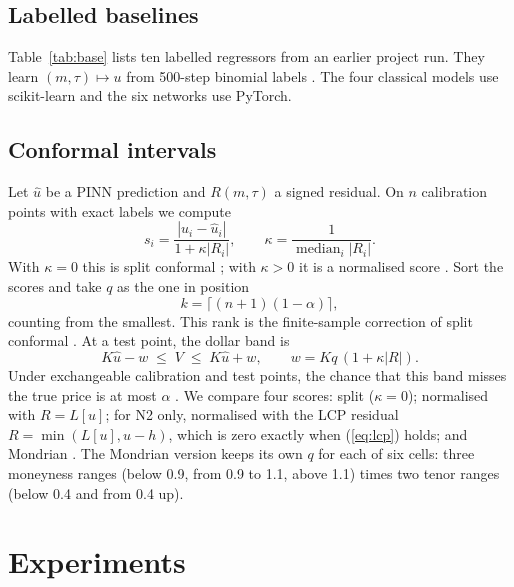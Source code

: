 \documentclass[conference]{IEEEtran}
\DeclareMathOperator*{\median}{median}
\begin{document}
\subsection{Labelled baselines}
Table~\ref{tab:base} lists ten labelled regressors from an earlier project run. They learn $(m,\tau)\mapsto u$ from 500-step binomial labels \cite{cox1979option}. The four classical models use scikit-learn \cite{pedregosa2011scikit} and the six networks use PyTorch.

\subsection{Conformal intervals}
Let $\hat u$ be a PINN prediction and $R(m,\tau)$ a signed residual. On $n$ calibration points with exact labels we compute
\begin{equation}
s_i=\frac{|u_i-\hat u_i|}{1+\kappa|R_i|},\qquad \kappa=\frac{1}{\median_i|R_i|}. \label{eq:score}
\end{equation}
With $\kappa=0$ this is split conformal \cite{papadopoulos2002inductive}; with $\kappa>0$ it is a normalised score \cite{papadopoulos2011regression}. Sort the scores and take $q$ as the one in position
\begin{equation}
k=\lceil (n+1)(1-\alpha)\rceil , \label{eq:k}
\end{equation}
counting from the smallest. This rank is the finite-sample correction of split conformal \cite{lei2018distribution}. At a test point, the dollar band is
\begin{equation}
K\hat u-w\;\le\;V\;\le\;K\hat u+w,\qquad w=Kq\,(1+\kappa|R|). \label{eq:band}
\end{equation}
Under exchangeable calibration and test points, the chance that this band misses the true price is at most $\alpha$ \cite{lei2018distribution}. We compare four scores: split ($\kappa=0$); normalised with $R=L[u]$; for N2 only, normalised with the LCP residual $R=\min(L[u],u-h)$, which is zero exactly when (\ref{eq:lcp}) holds; and Mondrian \cite{bostrom2020mondrian}. The Mondrian version keeps its own $q$ for each of six cells: three moneyness ranges (below 0.9, from 0.9 to 1.1, above 1.1) times two tenor ranges (below 0.4 and from 0.4 up).

\section{Experiments}
\end{document}
